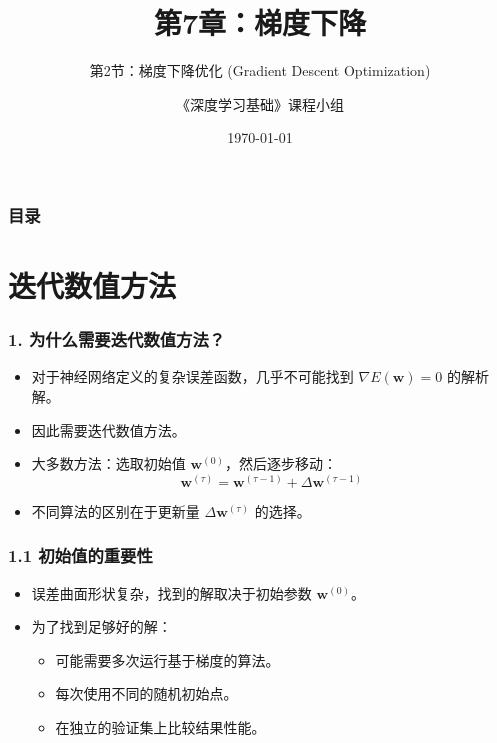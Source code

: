 \documentclass[t,aspectratio=169]{beamer} %
\title[7.2.梯度下降优化]{第7章：梯度下降}
\subtitle{第2节：梯度下降优化 (Gradient Descent Optimization)}
\author{《深度学习基础》课程小组}
\date{\today}
\begin{document}
\frame{\titlepage}

\begin{frame}
    \frametitle{目录}
    \tableofcontents
\end{frame}

\section{迭代数值方法}

\begin{frame}
    \frametitle{1. 为什么需要迭代数值方法？}
    \begin{itemize}
        \item 对于神经网络定义的复杂误差函数，\alert{几乎不可能找到 $\nabla E(\mathbf{w}) = 0$ 的解析解}。
        \item 因此需要\alert{迭代数值方法}。
        \item 大多数方法：选取初始值 $\mathbf{w}^{(0)}$，然后逐步移动：
        \begin{equation}
        \mathbf{w}^{(\tau)} = \mathbf{w}^{(\tau-1)} + \Delta \mathbf{w}^{(\tau-1)}
        \tag{7.15}
        \end{equation}
        \item 不同算法的区别在于\alert{更新量 $\Delta \mathbf{w}^{(\tau)}$ 的选择}。
    \end{itemize}
\end{frame}

\begin{frame}
    \frametitle{1.1 初始值的重要性}
    \begin{itemize}
        \item 误差曲面形状复杂，找到的解\alert{取决于初始参数 $\mathbf{w}^{(0)}$}。
        \item 为了找到足够好的解：
        \begin{itemize}
            \item 可能需要\alert{多次运行}基于梯度的算法。
            \item 每次使用\alert{不同的随机初始点}。
            \item 在独立的\alert{验证集}上比较结果性能。
        \end{itemize}
    \end{itemize}
\end{frame}

\end{document}
